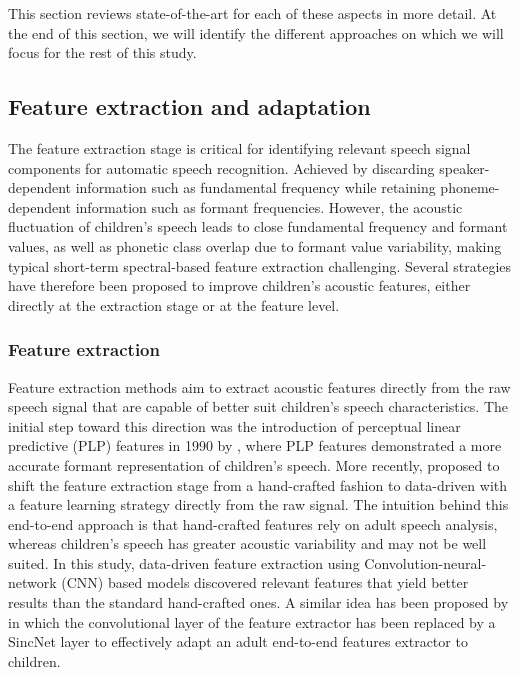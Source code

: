 This section reviews state-of-the-art for each of these aspects in more detail. At the end of this section, we will identify the different approaches on which we will focus for the rest of this study. 
\subsection{Feature extraction and adaptation}%
The feature extraction stage is critical for identifying relevant speech signal components for automatic speech recognition. Achieved by discarding speaker-dependent information such as fundamental frequency while retaining phoneme-dependent information such as formant frequencies.
However, the acoustic fluctuation of children's speech leads to close fundamental frequency and formant values, as well as phonetic class overlap due to formant value variability, making typical short-term spectral-based feature extraction challenging. Several strategies have therefore been proposed to improve children's acoustic features, either directly at the extraction stage or at the feature level.

\subsubsection{Feature extraction}
Feature extraction methods aim to extract acoustic features directly from the raw speech signal that are capable of better suit children's speech characteristics. The initial step toward this direction was the introduction of perceptual linear predictive (PLP) features in 1990 by \cite{Hermansky1990PerceptualLP}, where PLP features demonstrated a more accurate formant representation of children's speech.
More recently, \cite{feat_ext_from_raw} proposed to shift the feature extraction stage from a hand-crafted fashion to data-driven with a feature learning strategy directly from the raw signal. The intuition behind this end-to-end approach is that hand-crafted features rely on adult speech analysis, whereas children's speech has greater acoustic variability and may not be well suited. In this study, data-driven feature extraction using Convolution-neural-network (CNN) based models discovered relevant features that yield better results than the standard hand-crafted ones. A similar idea has been proposed by \cite{sincnet_adapt} in which the convolutional layer of the feature extractor has been replaced by a SincNet layer \cite{Sincnet} to effectively adapt an adult end-to-end features extractor to children.

